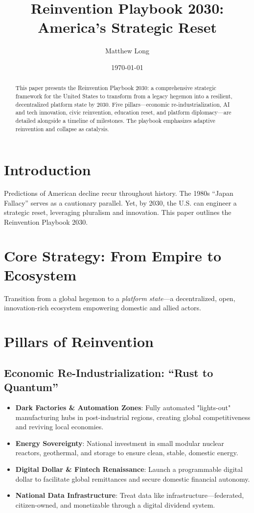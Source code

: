 \documentclass[11pt]{article}
\title{Reinvention Playbook 2030:\\America’s Strategic Reset}
\author{Matthew Long}
\date{\today}
\begin{document}
\maketitle
\begin{abstract}
This paper presents the Reinvention Playbook 2030: a comprehensive strategic framework for the United States to transform from a legacy hegemon into a resilient, decentralized platform state by 2030. Five pillars—economic re-industrialization, AI and tech innovation, civic reinvention, education reset, and platform diplomacy—are detailed alongside a timeline of milestones. The playbook emphasizes adaptive reinvention and collapse as catalysis.
\end{abstract}

\section{Introduction}
Predictions of American decline recur throughout history. The 1980s “Japan Fallacy” serves as a cautionary parallel. Yet, by 2030, the U.S. can engineer a strategic reset, leveraging pluralism and innovation. This paper outlines the Reinvention Playbook 2030.

\section{Core Strategy: From Empire to Ecosystem}
Transition from a global hegemon to a \emph{platform state}—a decentralized, open, innovation-rich ecosystem empowering domestic and allied actors.

\section{Pillars of Reinvention}
\subsection{Economic Re-Industrialization: “Rust to Quantum”}
\begin{itemize}
    \item \textbf{Dark Factories \& Automation Zones}: Fully automated "lights-out" manufacturing hubs in post-industrial regions, creating global competitiveness and reviving local economies.
    \item \textbf{Energy Sovereignty}: National investment in small modular nuclear reactors, geothermal, and storage to ensure clean, stable, domestic energy.
    \item \textbf{Digital Dollar \& Fintech Renaissance}: Launch a programmable digital dollar to facilitate global remittances and secure domestic financial autonomy.
    \item \textbf{National Data Infrastructure}: Treat data like infrastructure—federated, citizen-owned, and monetizable through a digital dividend system.
\end{itemize}
\end{document}
